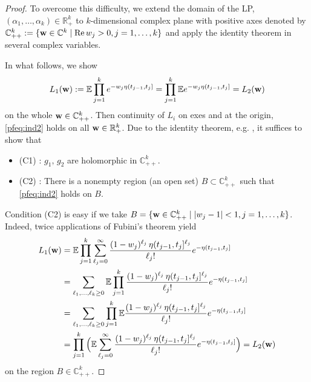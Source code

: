 \documentclass[11pt,leqno%
]{amsart}
\newcommand{\bfw}{{\bf w}}
\newcommand{\R}{\mathbb{R}}
\newcommand{\E }{{\mathbb E}}
\newcommand{\1}{{\mathbf 1}}
\begin{document}
\begin{proof}
 To overcome this difficulty, we extend the domain of the LP,
 $(\alpha_1,\ldots,\alpha_k)\in \R_+^k$ to $k$-dimensional complex plane
 with positive axes denoted by $\mathbb{C}^k_{++}:=\{\bfw \in \mathbb{C}^k \mid \mathrm{Re}\, w_j >
 0,j=1,\ldots,k\}$ and apply the identity theorem in several complex
 variables. 

 In what follows, we show  
 \begin{align}
\label{pfeq:ind2}
  L_1(\bfw):= \E \prod_{j=1}^k e^{-w_j \eta(t_{j-1},t_j]}  = \prod_{j=1}^k \E
 e^{-w_j \eta(t_{j-1},t_j]} =L_2(\bfw) 
 \end{align}  
 on the whole $\bfw\in \mathbb{C}_{++}^k$. Then
 continuity of $L_i$ on exes and at the origin, \eqref{pfeq:ind2}
 holds on all $\bfw \in \R_+^k$. 
Due to the identity theorem, e.g. \cite[Theorem
 4.1, Ch.1]{grauert:fritzsche:1976}, it suffices to show that 
\begin{itemize}
 \item (C1) : $g_1,\,g_2$ are holomorphic in $\mathbb{C}^k_{++}$.
 \item (C2) : There is a nonempty region (an open set) $B\subset
 \mathbb{C}^k_{++}$ such that \eqref{pfeq:ind2} holds on $B$.  
\end{itemize}
Condition (C2) is easy if we take $B=\{\bfw\in \mathbb{C}_{++}^k\mid
 |w_j-1|<1,j=1,\ldots,k \}$. Indeed, 
 twice applications of Fubini's theorem yield 
 \begin{align*}
  L_1(\bfw) %
  &= \E \prod_{j=1}^k
  \sum_{\ell_j =0}^\infty
  \frac{(1-w_j)^{\ell_j}\,\eta(t_{j-1},t_j]^{\ell_j}}{\ell_j !}e^{-\eta(t_{j-1},t_j]} \\
 &= \sum_{\ell_1,\ldots,\ell_k\ge 0}\E
  \prod_{j=1}^k\frac{(1-w_j)^{\ell_j}\,\eta(t_{j-1},t_j]^{\ell_j}}{\ell_j
  !}e^{-\eta(t_{j-1},t_j]}  \\
 &= \sum_{\ell_1,\ldots,\ell_k\ge 0}
  \prod_{j=1}^k \E
  \frac{(1-w_j)^{\ell_j}\,\eta(t_{j-1},t_j]^{\ell_j}}{\ell_j
  !}e^{-\eta(t_{j-1},t_j]}  \\
 & = \prod_{j=1}^k \Big( \E \sum_{\ell_j=0}^\infty
  \frac{(1-w_j)^{\ell_j}\,\eta(t_{j-1},t_j]^{\ell_j}}{\ell_j !}e^{-\eta(t_{j-1},t_j]}\Big)=L_2(\bfw) 
 \end{align*}
on the region $B\in \mathbb{C}_{++}^k$.  


\end{proof}
\end{document}
